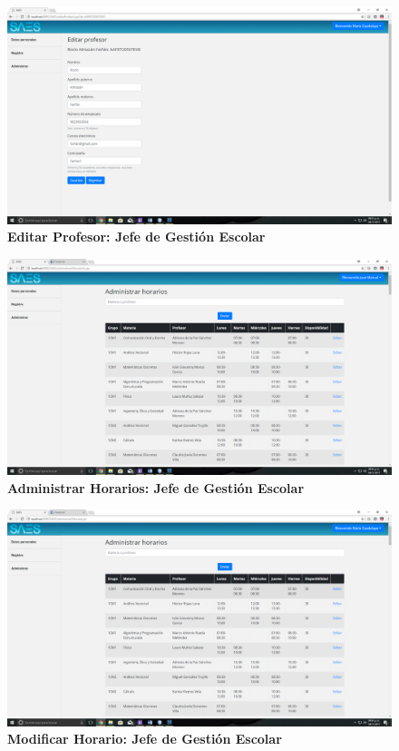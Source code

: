 \begin{figure}[H]
  \centering
    \includegraphics[scale=0.2]{project/images/26.png}
  \caption{\textbf{Editar Profesor: Jefe de Gestión Escolar}}
\end{figure}
\begin{figure}[H]
  \centering
    \includegraphics[scale=0.2]{project/images/12.png}
  \caption{\textbf{Administrar Horarios: Jefe de Gestión Escolar}}
\end{figure}
\begin{figure}[H]
  \centering
    \includegraphics[scale=0.2]{project/images/28.png}
  \caption{\textbf{Modificar Horario: Jefe de Gestión Escolar}}
\end{figure}
